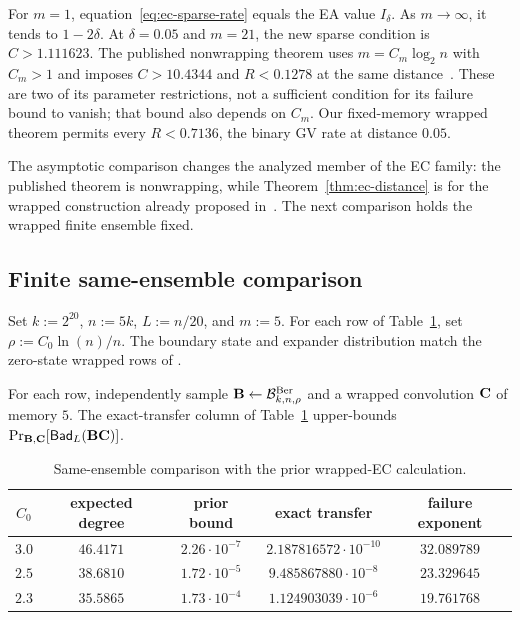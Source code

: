 For $m=1$, equation~\eqref{eq:ec-sparse-rate} equals the EA value
$I_\delta$.  As $m\to\infty$, it tends to $1-2\delta$.  At
$\delta=0.05$ and $m=21$, the new sparse condition is $C>1.111623$.
The published nonwrapping theorem uses $m=C_m\log_2 n$ with $C_m>1$ and
imposes $C>10.4344$ and $R<0.1278$ at the same distance~\cite[Theorem~3]{EC}.
These are two of its parameter restrictions, not a sufficient condition for
its failure bound to vanish; that bound also depends on $C_m$.
Our fixed-memory wrapped theorem permits every $R<0.7136$, the binary GV
rate at distance $0.05$.

The asymptotic comparison changes the analyzed member of the EC family: the
published theorem is nonwrapping, while Theorem~\ref{thm:ec-distance} is for
the wrapped construction already proposed in~\cite{EC}.  The next comparison
holds the wrapped finite ensemble fixed.

\subsection{Finite same-ensemble comparison}

Set $k:=2^{20}$, $n:=5k$, $L:=n/20$, and $m:=5$.  For each row of
Table~\ref{tab:ec-same-ensemble}, set $\rho:=C_0\ln(n)/n$.  The boundary state
and expander distribution match the zero-state wrapped rows of
\cite[Table~4]{EC}.

\begin{theorem}
\label{thm:ec-finite-comparison}
For each row, independently sample
$\mathbf B\gets\mathcal B^{\mathrm{Ber}}_{k,n,\rho}$ and a wrapped convolution
$\mathbf C$ of memory $5$.  The exact-transfer column of
Table~\ref{tab:ec-same-ensemble} upper-bounds
$\Pr_{\mathbf B,\mathbf C}[\mathsf{Bad}_L(\mathbf B\mathbf C)]$.
\end{theorem}

\begin{table}[t]
\centering
\caption{Same-ensemble comparison with the prior wrapped-EC calculation.}
\label{tab:ec-same-ensemble}
\begin{tabular}{@{}ccccc@{}}
\toprule
$C_0$ & expected degree & prior bound & exact transfer & failure exponent \\
\midrule
$3.0$ & $46.4171$ & $2.26\cdot10^{-7}$ & $2.187816572\cdot10^{-10}$ & $32.089789$ \\
$2.5$ & $38.6810$ & $1.72\cdot10^{-5}$ & $9.485867880\cdot10^{-8}$ & $23.329645$ \\
$2.3$ & $35.5865$ & $1.73\cdot10^{-4}$ & $1.124903039\cdot10^{-6}$ & $19.761768$ \\
\bottomrule
\end{tabular}
\end{table}

